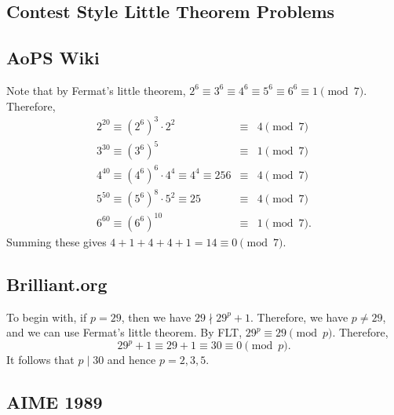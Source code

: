 \subsection{Contest Style Little Theorem Problems}
\clearpage
\subsection*{AoPS Wiki}
Note that by Fermat's little theorem, $2^6\equiv 3^6\equiv 4^6\equiv 5^6\equiv 6^6\equiv 1\pmod{7}$. Therefore, \begin{eqnarray*} 2^{20}\equiv \left(2^6\right)^3\cdot 2^2&\equiv& 4\pmod{7} \\ 3^{30}\equiv \left(3^6\right)^5&\equiv& 1\pmod{7} \\ 4^{40}\equiv \left(4^6\right)^{6}\cdot 4^4\equiv 4^4\equiv 256&\equiv& 4\pmod{7} \\ 5^{50}\equiv \left(5^6\right)^{8}\cdot 5^2\equiv 25&\equiv& 4\pmod{7} \\ 6^{60} \equiv \left(6^6\right)^{10}&\equiv& 1\pmod{7}. \end{eqnarray*} 
\clearpage
Summing these gives $4+1+4+4+1=14\equiv \boxed{0}\pmod{7}$. 
\subsection*{Brilliant.org} To begin with, if $p=29$, then we have $29\nmid 29^p+1$. Therefore, we have $p\neq 29$, and we can use Fermat's little theorem. By FLT, $29^p\equiv 29\pmod{p}$. Therefore, $$29^p+1\equiv 29+1\equiv 30\equiv 0\pmod{p}.$$ It follows that $p\mid 30$ and hence $p=\boxed{2,3,5}$.
\clearpage
	
\subsection{AIME 1989}

